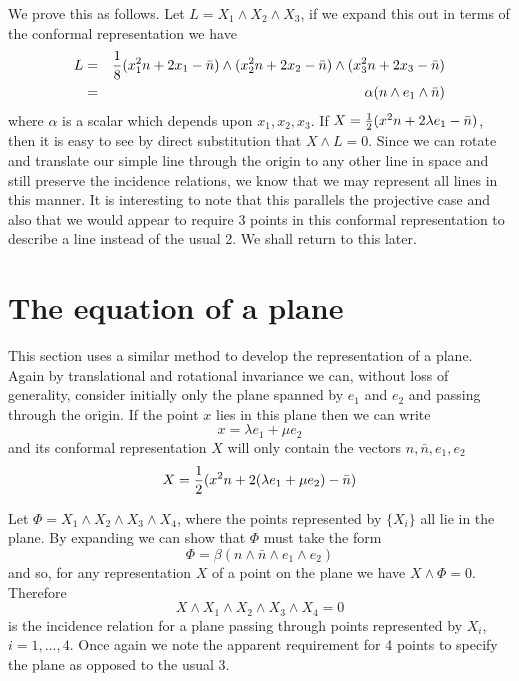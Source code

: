 We prove this as follows. Let $L=X_1\wedge X_2\wedge X_3$,
if we expand this out in terms of the conformal
representation we have
%
\begin{eqnarray}
 L & = & \frac{1}{8}(x_1^2n + 2x_1-\bar{n})\wedge (x_2^2n + 2x_2-\bar{n})\wedge (x_3^2n
+ 2x_3-\bar{n})\nonumber \\
   & = & \alpha (n\wedge e_1 \wedge \bar{n})
\end{eqnarray}
%
where $\alpha$ is a scalar which depends upon $x_1,x_2,x_3$.
If $X = \frac{1}{2}(x^2n + 2\lambda e_1 - \bar{n})$, then it is easy to see by
direct substitution that $X\wedge L = 0$. Since we can rotate and
translate our simple line through the origin to any other
line in space and still preserve the incidence relations,
we know that we may represent all lines in this manner. It is
interesting to note that this parallels the projective case
and also that we would appear to require 3 points in this
conformal representation to describe a line instead of the usual
2. We shall return to this later.

\section{The equation of a plane}

This section uses a similar method to develop the representation
of a plane. Again by translational and rotational invariance we can, 
without loss of generality, consider initially only the plane spanned
by $e_1$ and $e_2$ and passing through the origin. If the point $x$ 
lies in this plane then we can write
%
\[  x = \lambda e_1 + \mu e_2  \]
%
and its conformal representation $X$ will only
contain the vectors  $n,\bar{n},e_1,e_2$
%
\[ X =  \frac{1}{2}(x^2n + 2(\lambda e_1 + \mu e_2) - \bar{n})  \]

Let $\Phi = X_1 \wedge X_2 \wedge X_3 \wedge X_4$, where the points represented
by $\{X_i\}$ all lie in the plane. By expanding we can show that 
$\Phi$ must take the form
%
\[  \Phi = \beta (n\wedge \bar{n} \wedge e_1 \wedge e_2)  \]
%
and so, for any representation $X$ of a point on the plane we have 
$X\wedge \Phi = 0$. Therefore
%
\begin{equation}
     X\wedge X_1 \wedge X_2 \wedge X_3 \wedge X_4 = 0
     \end{equation}
%
is the incidence relation for a plane passing through points represented by
$X_i$, $i=1,...,4$. Once again we note the apparent requirement for
4 points to specify the plane as opposed to the usual 3.

